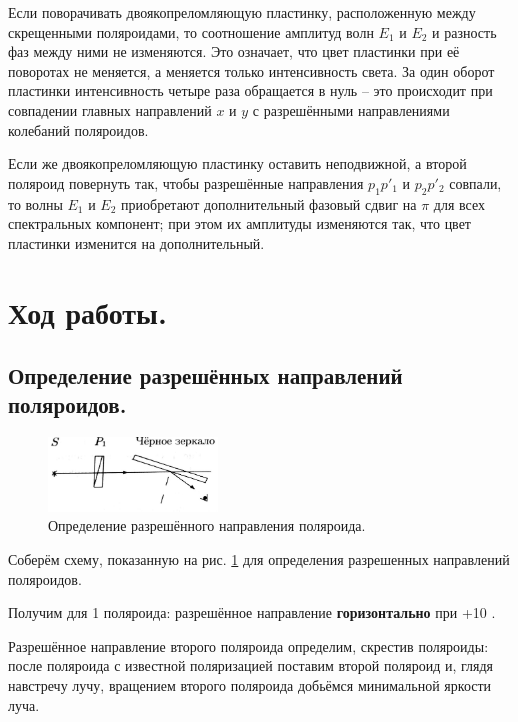 \documentclass[a4paper, 12pt, twoside]{article}
\begin{document}
 Если поворачивать двоякопреломляющую пластинку, расположенную между скрещенными поляроидами, то соотношение амплитуд волн $E_1$ и $E_2$  и разность фаз между ними не изменяются. Это означает, что цвет пластинки при её поворотах не меняется, а меняется только интенсивность света. За один оборот пластинки интенсивность четыре раза обращается в нуль -- это происходит при совпадении главных направлений $x$ и $y$ с разрешёнными направлениями колебаний поляроидов.
 
 Если же двоякопреломляющую пластинку оставить неподвижной, а второй поляроид повернуть так, чтобы разрешённые направления $p_1 p'_1$ и $p_2 p'_2$ совпали, то волны $E_1$ и $E_2$ приобретают дополнительный фазовый сдвиг на $\pi$ для всех спектральных компонент; при этом их амплитуды изменяются так, что цвет пластинки изменится на дополнительный.
 
 
 \newpage
 	
	 
	 
	 
	 
	 \section{Ход работы.}
	
	\subsection{Определение разрешённых направлений поляроидов.}
	
	\begin{figure}[H]
		\centering
		\includegraphics[width =  0.4\textwidth]{img1}
		\caption{Определение разрешённого направления поляроида.}
		\label{img1}
	\end{figure}

Соберём схему, показанную на рис. \ref{img1} для определения разрешенных направлений поляроидов.

Получим для 1 поляроида: разрешённое направление \textbf{горизонтально} при +10 \degree.

Разрешённое направление второго поляроида определим, скрестив поляроиды: после поляроида с известной поляризацией поставим второй поляроид и, глядя навстречу лучу, вращением второго поляроида добьёмся минимальной яркости луча.
	
\end{document}
